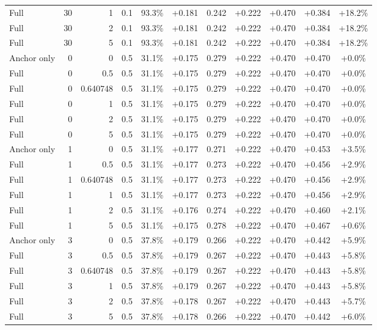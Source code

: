 \begin{table}[htbp]
\begin{tabular}{lrrrccccccc}
Full & 30 & 1 & 0.1 & 93.3\% & +0.181 & 0.242 & +0.222 & +0.470 & +0.384 & +18.2\% \\
Full & 30 & 2 & 0.1 & 93.3\% & +0.181 & 0.242 & +0.222 & +0.470 & +0.384 & +18.2\% \\
Full & 30 & 5 & 0.1 & 93.3\% & +0.181 & 0.242 & +0.222 & +0.470 & +0.384 & +18.2\% \\
Anchor only & 0 & 0 & 0.5 & 31.1\% & +0.175 & 0.279 & +0.222 & +0.470 & +0.470 & +0.0\% \\
Full & 0 & 0.5 & 0.5 & 31.1\% & +0.175 & 0.279 & +0.222 & +0.470 & +0.470 & +0.0\% \\
Full & 0 & 0.640748 & 0.5 & 31.1\% & +0.175 & 0.279 & +0.222 & +0.470 & +0.470 & +0.0\% \\
Full & 0 & 1 & 0.5 & 31.1\% & +0.175 & 0.279 & +0.222 & +0.470 & +0.470 & +0.0\% \\
Full & 0 & 2 & 0.5 & 31.1\% & +0.175 & 0.279 & +0.222 & +0.470 & +0.470 & +0.0\% \\
Full & 0 & 5 & 0.5 & 31.1\% & +0.175 & 0.279 & +0.222 & +0.470 & +0.470 & +0.0\% \\
Anchor only & 1 & 0 & 0.5 & 31.1\% & +0.177 & 0.271 & +0.222 & +0.470 & +0.453 & +3.5\% \\
Full & 1 & 0.5 & 0.5 & 31.1\% & +0.177 & 0.273 & +0.222 & +0.470 & +0.456 & +2.9\% \\
Full & 1 & 0.640748 & 0.5 & 31.1\% & +0.177 & 0.273 & +0.222 & +0.470 & +0.456 & +2.9\% \\
Full & 1 & 1 & 0.5 & 31.1\% & +0.177 & 0.273 & +0.222 & +0.470 & +0.456 & +2.9\% \\
Full & 1 & 2 & 0.5 & 31.1\% & +0.176 & 0.274 & +0.222 & +0.470 & +0.460 & +2.1\% \\
Full & 1 & 5 & 0.5 & 31.1\% & +0.175 & 0.278 & +0.222 & +0.470 & +0.467 & +0.6\% \\
Anchor only & 3 & 0 & 0.5 & 37.8\% & +0.179 & 0.266 & +0.222 & +0.470 & +0.442 & +5.9\% \\
Full & 3 & 0.5 & 0.5 & 37.8\% & +0.179 & 0.267 & +0.222 & +0.470 & +0.443 & +5.8\% \\
Full & 3 & 0.640748 & 0.5 & 37.8\% & +0.179 & 0.267 & +0.222 & +0.470 & +0.443 & +5.8\% \\
Full & 3 & 1 & 0.5 & 37.8\% & +0.179 & 0.267 & +0.222 & +0.470 & +0.443 & +5.8\% \\
Full & 3 & 2 & 0.5 & 37.8\% & +0.178 & 0.267 & +0.222 & +0.470 & +0.443 & +5.7\% \\
Full & 3 & 5 & 0.5 & 37.8\% & +0.178 & 0.266 & +0.222 & +0.470 & +0.442 & +6.0\% \\

\end{tabular}
\end{table}
